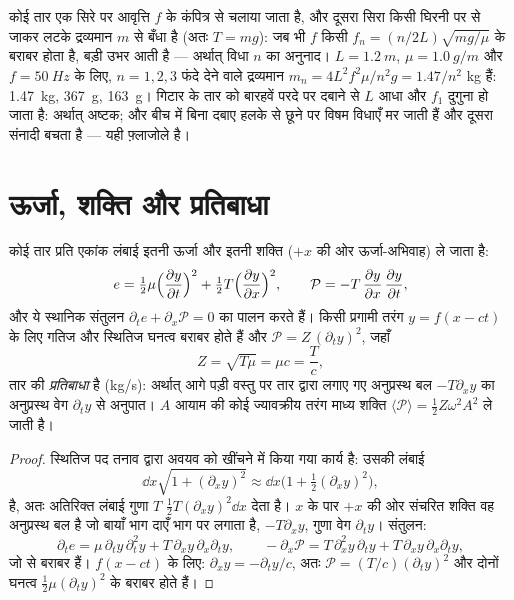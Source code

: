 \begin{example}[मेल्डे का प्रयोग]\label{ex:b2:waves-on-strings:melde}
कोई तार एक सिरे पर आवृत्ति $f$ के कंपित्र से चलाया जाता है, और दूसरा सिरा
किसी घिरनी पर से जाकर लटके द्रव्यमान $m$ से बँधा है (अतः $T = mg$): जब भी
$f$ किसी $f_n = (n/2L)
\sqrt{mg/\mu}$ के बराबर होता है, बड़ी  उभर आती है --- अर्थात् विधा $n$ का अनुनाद। $L = \qty{1.2}{m}$, $\mu =
\qty{1.0}{g/m}$ और $f = \qty{50}{Hz}$ के लिए, $n = 1, 2, 3$ फंदे देने वाले द्रव्यमान
$m_n = 4L^2f^2\mu/n^2g = 1.47/n^2$ kg हैं: \qty{1.47}{kg}, \qty{367}{g}, \qty{163}{g}।
गिटार के तार को बारहवें परदे पर दबाने से $L$ आधा और
$f_1$ दुगुना हो जाता है: अर्थात् अष्टक; और बीच में बिना दबाए हलके से छूने पर
विषम विधाएँ मर जाती हैं और दूसरा संनादी बचता है --- यही फ़्लाजोले है।
\end{example}

\section{ऊर्जा, शक्ति और प्रतिबाधा}

\begin{proposition}[तार-तरंग की ऊर्जा]\label{prop:b2:waves-on-strings:energy}
कोई तार प्रति एकांक लंबाई इतनी ऊर्जा और इतनी शक्ति ($+x$ की ओर
ऊर्जा-अभिवाह) ले जाता है:
\[
e = \tfrac12\mu\Bigl(\frac{\partial y}{\partial t}\Bigr)^2 + \tfrac12T\Bigl(\frac{\partial y}{\partial x}\Bigr)^2 ,
\qquad
\mathcal P = -T\,\frac{\partial y}{\partial x}\,\frac{\partial y}{\partial t} ,
\]
और ये स्थानिक संतुलन $\partial_te + \partial_x\mathcal P = 0$ का पालन करते हैं। किसी
प्रगामी तरंग $y = f(x - ct)$ के लिए गतिज और स्थितिज घनत्व
बराबर होते हैं और $\mathcal P = Z\,(\partial_ty)^2$, जहाँ
\[
Z = \sqrt{T\mu} = \mu c = \frac Tc ,
\]
तार की \emph{प्रतिबाधा} है (\unit{kg/s}): अर्थात् आगे पड़ी वस्तु पर तार
द्वारा लगाए गए अनुप्रस्थ बल $-T\partial_xy$ का अनुप्रस्थ वेग $\partial_ty$ से
अनुपात। $A$ आयाम की कोई ज्यावक्रीय तरंग
माध्य शक्ति $\langle\mathcal P\rangle = \tfrac12Z\omega^2A^2$ ले जाती है।
\end{proposition}

\begin{proof}
स्थितिज पद तनाव द्वारा अवयव को खींचने में किया गया कार्य है:
उसकी लंबाई
\[
\dd x\sqrt{1 + (\partial_xy)^2} \approx \dd x\bigl(1 + \tfrac12(\partial_xy)^2\bigr) ,
\]
है, अतः अतिरिक्त लंबाई गुणा $T$ $\tfrac12T(\partial_xy)^2\dd x$ देता है। $x$ के
पार $+x$ की ओर संचरित शक्ति वह अनुप्रस्थ बल है जो
बायाँ भाग दाएँ भाग पर लगाता है, $-T\partial_xy$, गुणा वेग
$\partial_ty$। संतुलन:
\[
\partial_te = \mu\,\partial_ty\,\partial_t^2y + T\,\partial_xy\,\partial_x\partial_ty ,
\qquad
-\partial_x\mathcal P = T\,\partial_x^2y\,\partial_ty + T\,\partial_xy\,\partial_x\partial_ty ,
\]
जो  से बराबर हैं। $f(x - ct)$ के लिए: $\partial_xy = -\partial_ty/c$, अतः $\mathcal P = (T/c)
(\partial_ty)^2$ और दोनों घनत्व $\tfrac12\mu(\partial_ty)^2$ के बराबर होते हैं।
\end{proof}

